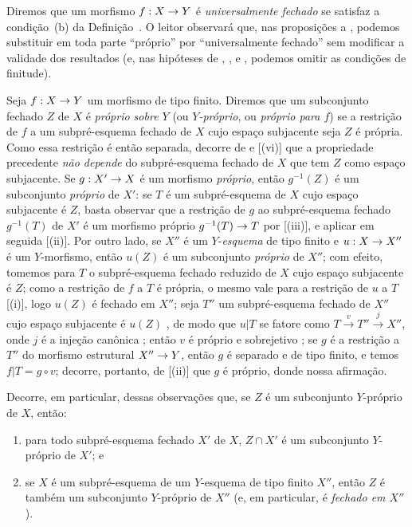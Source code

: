 \documentclass[oneside,10pt]{amsart}
\makeatletter
\newcommand{\ega@arrow}[2]{\mathchoice{#1}{#2}{#2}{#2}}
\renewcommand{\to}{\ega@arrow{\longrightarrow}{\rightarrow}}
\newcommand{\oldpage}[2][]{\marginnote{\normalfont\footnotesize\textbf{#1}~|~#2}\ignorespaces}
\let\EGAOriginalLabel\label
\renewcommand{\label}[1]{\phantomsection\EGAOriginalLabel{#1}}
\makeatother
\begin{document}
\begin{remark}[5.4.9]
\label{II.5.4.9}
Diremos que um morfismo $f:X\to Y$ é \emph{universalmente fechado} se satisfaz a condição~(b) da Definição~.
O leitor observará que,
\oldpage[II]{103}
nas proposições  a , podemos substituir em toda parte ``próprio'' por ``universalmente fechado'' sem modificar a validade dos resultados (e, nas hipóteses de , ,  e , podemos omitir as condições de finitude).
\end{remark}

\begin{env}[5.4.10]
\label{II.5.4.10}
Seja $f:X\to Y$ um morfismo de tipo finito.
Diremos que um subconjunto fechado $Z$ de $X$ é \emph{próprio sobre $Y$} (ou \emph{$Y$-próprio}, ou \emph{próprio para $f$}) se a restrição de $f$ a um subpré-esquema fechado de $X$ cujo espaço subjacente seja $Z$  é própria.
Como essa restrição é então separada, decorre de  e [(vi)] que a propriedade precedente \emph{não depende} do subpré-esquema fechado de $X$ que tem $Z$ como espaço subjacente.
Se $g:X'\to X$ é um morfismo \emph{próprio}, então $g^{-1}(Z)$ é um subconjunto \emph{próprio} de $X'$:
se $T$ é um subpré-esquema de $X$ cujo espaço subjacente é $Z$, basta observar que a restrição de $g$ ao subpré-esquema fechado $g^{-1}(T)$ de $X'$ é um morfismo próprio $g^{-1}(T)\to T$ por [(iii)], e aplicar em seguida [(ii)].
Por outro lado, se $X''$ é um $Y$-\emph{esquema} de tipo finito e $u:X\to X''$ é um $Y$-morfismo, então $u(Z)$ é um subconjunto \emph{próprio} de $X''$;
com efeito, tomemos para $T$ o subpré-esquema fechado reduzido de $X$ cujo espaço subjacente é $Z$;
como a restrição de $f$ a $T$ é própria, o mesmo vale para a restrição de $u$ a $T$ [(i)], logo $u(Z)$ é fechado em $X''$;
seja $T''$ um subpré-esquema fechado de $X''$ cujo espaço subjacente é $u(Z)$ , de modo que $u|T$ se fatore como $T\xrightarrow{v}T''\xrightarrow{j}X''$, onde $j$ é a injeção canônica ; então $v$ é próprio e sobrejetivo ;
se $g$ é a restrição a $T''$ do morfismo estrutural $X''\to Y$, então $g$ é separado e de tipo finito, e temos $f|T=g\circ v$;
decorre, portanto, de [(ii)] que $g$ é próprio, donde nossa afirmação.
\end{env}

Decorre, em particular, dessas observações que, se $Z$ é um subconjunto $Y$-próprio de $X$, então:
\begin{enumerate}
  \item para todo subpré-esquema fechado $X'$ de $X$, $Z\cap X'$ é um subconjunto $Y$-próprio de $X'$; e
  \item se $X$ é um subpré-esquema de um $Y$-esquema de tipo finito $X''$, então $Z$ é também um subconjunto $Y$-próprio de $X''$ (e, em particular, é \emph{fechado em $X''$}).
\end{enumerate}
\end{document}
